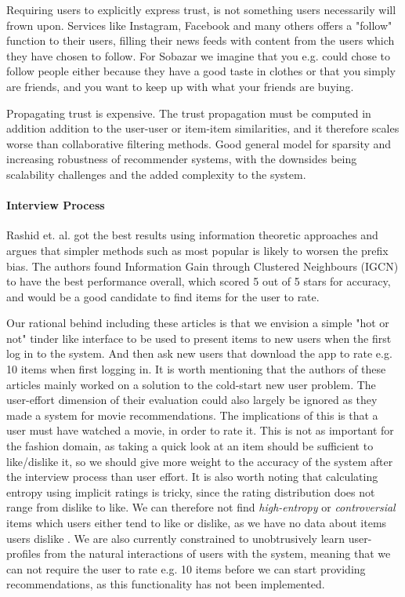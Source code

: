 Requiring users to explicitly express trust, is not something users necessarily
will frown upon. Services like Instagram, Facebook and many others offers a
"follow" function to their users, filling their news feeds with content from
the users which they have chosen to follow. For Sobazar we imagine that you
e.g. could chose to follow people either because they have a good taste in
clothes or that you simply are friends, and you want to keep up with what your
friends are buying.

Propagating trust is expensive. The trust propagation must be computed in
addition addition to the user-user or item-item similarities, and it therefore
scales worse than collaborative filtering methods. Good general model for
sparsity and increasing robustness of recommender systems, with the downsides
being scalability challenges and the added complexity to the system.

\paragraph{Interview Process}

Rashid et. al. \cite{Rashid2008} got the best results using information
theoretic approaches and argues that simpler methods such as most popular is
likely to worsen the prefix bias. The authors found Information Gain through
Clustered Neighbours (IGCN) to have the best performance overall, which scored
5 out of 5 stars for accuracy, and would be a good candidate to find items for
the user to rate.


Our rational behind including these articles is that we envision a simple "hot
or not" tinder like interface to be used to present items to new users when the
first log in to the system. And then ask new users that download the app to
rate e.g. 10 items when first logging in. It is worth mentioning that the
authors of these articles mainly worked on a solution to the cold-start new
user problem. The user-effort dimension of their evaluation could also largely
be ignored as they made a system for movie recommendations. The implications of
this is that a user must have watched a movie, in order to rate it. This is not
as important for the fashion domain, as taking a quick look at an item should
be sufficient to like/dislike it, so we should give more weight to the accuracy
of the system after the interview process than user effort. It is also worth
noting that calculating entropy using implicit ratings is tricky, since the
rating distribution does not range from dislike to like. We can therefore not
find \emph{high-entropy} or \emph{controversial} items which users either tend
to like or dislike, as we have no data about items users dislike
. We are also currently constrained to unobtrusively learn
user-profiles from the natural interactions of users with the system, meaning
that we can not require the user to rate e.g. 10 items before we can start
providing recommendations, as this functionality has not been implemented.


